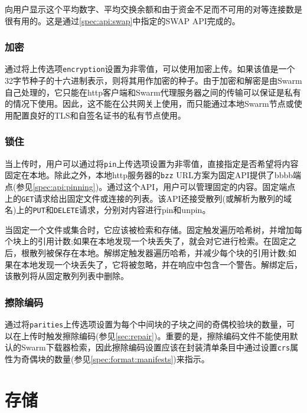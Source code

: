 向用户显示这个平均数字、平均交换余额和由于资金不足而不可用的对等连接数是很有用的。这是通过\ref{spec:api:swap}中指定的SWAP API完成的。

\subsubsection{加密}

通过将上传选项\lstinline{encryption}设置为非零值，可以使用加密上传。如果该值是一个32字节种子的十六进制表示，则将其用作加密的种子。由于加密和解密是由Swarm自己处理的，它只能在http客户端和Swarm代理服务器之间的传输可以保证是私有的情况下使用。因此，这不能在公共网关上使用，而只能通过本地Swarm节点或使用配置良好的TLS和自签名证书的私有节点使用。

\subsubsection{锁住}

当上传时，用户可以通过将\lstinline{pin}上传选项设置为非零值，直接指定是否希望将内容固定在本地。除此之外，本地http服务器的\lstinline{bzz} URL方案为固定API提供了bbbb端点(参见\ref{spec:api:pinning})。通过这个API，用户可以管理固定的内容。固定端点上的\lstinline{GET}请求给出固定文件或连接的列表。该API还接受散列(或解析为散列的域名)上的\lstinline{PUT}和\lstinline{DELETE}请求，分别对内容进行pin和unpin。

当固定一个文件或集合时，它应该被检索和存储。固定触发遍历哈希树，并增加每个块上的引用计数;如果在本地发现一个块丢失了，就会对它进行检索。在固定之后，根散列被保存在本地。解绑定触发器遍历哈希，并减少每个块的引用计数;如果在本地发现一个块丢失了，它将被忽略，并在响应中包含一个警告。解绑定后，该散列将从固定散列列表中删除。 



\subsubsection{擦除编码}

通过将\lstinline{parities}上传选项设置为每个中间块的子块之间的奇偶校验块的数量，可以在上传时触发擦除编码(参见\ref{sec:repair})。重要的是，擦除编码文件不能使用默认的Swarm下载器检索，因此擦除编码设置应该在封装清单条目中通过设置\lstinline{crs}属性为奇偶块的数量(参见\ref{spec:format:manifests})来指示。 

\section{存储\statusgreen}\label{sec:storage-ux}

